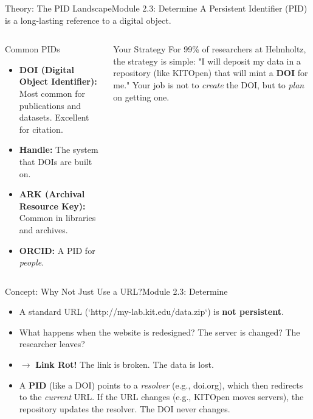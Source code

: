 \begin{frame}{Theory: The PID Landscape}{Module 2.3: Determine}
    A Persistent Identifier (PID) is a long-lasting reference to a digital object.
    
    \begin{columns}
        \begin{block}{Common PIDs}
            \begin{itemize}
                \item \textbf{DOI (Digital Object Identifier):} Most common for publications and datasets. Excellent for citation.
                \item \textbf{Handle:} The system that DOIs are built on.
                \item \textbf{ARK (Archival Resource Key):} Common in libraries and archives.
                \item \textbf{ORCID:} A PID for \emph{people}.
            \end{itemize}
        \end{block}
        
        \begin{block}{Your Strategy}
            For 99\% of researchers at Helmholtz, the strategy is simple:
            \pause
            "I will deposit my data in a repository (like KITOpen) that will mint a \textbf{DOI} for me."
            \pause
            Your job is not to \emph{create} the DOI, but to \emph{plan} on getting one.
        \end{block}
    \end{columns}
\end{frame}

\begin{frame}{Concept: Why Not Just Use a URL?}{Module 2.3: Determine}
    
    \begin{itemize}
        \item A standard URL (`http://my-lab.kit.edu/data.zip`) is \textbf{not persistent}.
        \item What happens when the website is redesigned? The server is changed? The researcher leaves?
        \item $\rightarrow$ \textbf{Link Rot!} The link is broken. The data is lost.
        \pause
        \item A \textbf{PID} (like a DOI) points to a \textit{resolver} (e.g., doi.org), which then redirects to the \textit{current} URL. If the URL changes (e.g., KITOpen moves servers), the repository updates the resolver. The DOI never changes.
    \end{itemize}
\end{frame}

